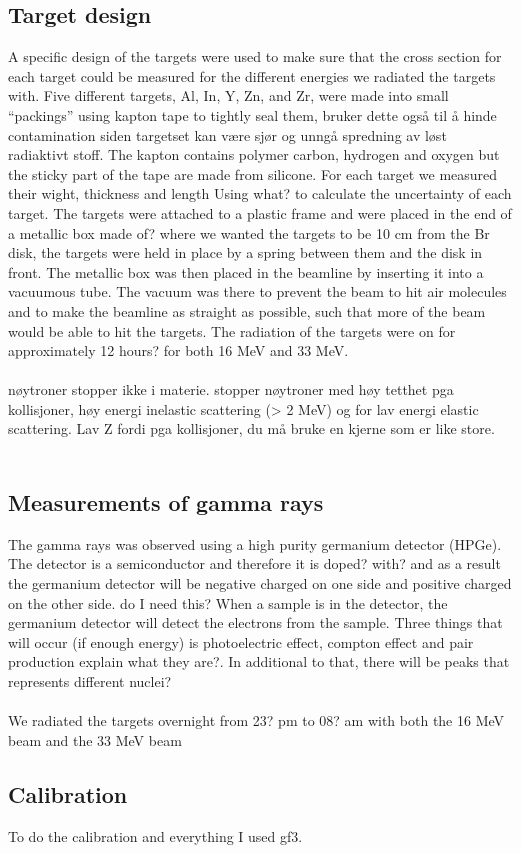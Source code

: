 \documentclass[11pt,showpacs,preprintnumbers,footinbib,amsmath,amssymb,aps,prl,groupedaddress,superscriptaddress,showkeys]{revtex4-1}
\begin{document}
\subsection{Target design}
\noindent
A specific design of the targets were used to make sure that the cross section for each target could be measured for the different energies we radiated the targets with. Five different targets, Al, In, Y, Zn, and Zr, were made into small “packings” using kapton tape to tightly seal them, bruker dette også til å hinde contamination siden targetset kan være sjør og unngå spredning av løst radiaktivt stoff. The kapton contains polymer carbon, hydrogen and oxygen but the sticky part of the tape are made from silicone. For each target we measured their wight, thickness and length Using what? to calculate the uncertainty of each target. The targets were attached to a plastic frame and were placed in the end of a metallic box made of? where we wanted the targets to be 10 cm from the Br disk, the targets were held in place by a spring between them and the disk in front. The metallic box was then placed in the beamline by inserting it into a vacuumous tube. The vacuum was there to prevent the beam to hit air molecules and to make the beamline as straight as possible, such that more of the beam would be able to hit the targets. The radiation of the targets were on for approximately 12 hours? for both 16 MeV and 33 MeV. \\
\\
nøytroner stopper ikke i materie. stopper nøytroner med høy tetthet pga kollisjoner, høy energi inelastic scattering (> 2 MeV) og for lav energi elastic scattering. Lav Z fordi pga kollisjoner, du må bruke en kjerne som er like store.\\
\\
\subsection{Measurements of gamma rays}
\noindent
The gamma rays was observed using a high purity germanium detector (HPGe). The detector is a semiconductor and therefore it is doped? with? and as a result the germanium detector will be negative charged on one side and positive charged on the other side. do I need this?
When a sample is in the detector, the germanium detector will detect the electrons from the sample. Three things that will occur (if enough energy) is photoelectric effect, compton effect and pair production explain what they are?. In additional to that, there will be peaks that represents different nuclei?\\
\\
We radiated the targets overnight from 23? pm to 08? am with both the 16 MeV beam and the 33 MeV beam


\subsection{Calibration}
\noindent
To do the calibration and everything I used gf3. 





\newpage
\end{document}
